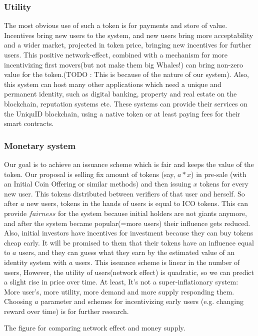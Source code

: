 \documentclass[conference]{IEEEtran}
\begin{document}
\subsubsection{Utility} 
The most obvious use of such a token is for payments and store of value. Incentives bring new users to the system, and new users bring more acceptability and a wider market, projected in token price, bringing new incentives for further users. This positive network-effect, combined with a mechanism for more incentivizing first movers(but not make them big Whales!) can bring non-zero value for the token.(TODO : This is because of the nature of our system). Also, this system can host many other applications which need a unique and permanent identity, such as digital banking, property and real estate on the blockchain, reputation systems etc. These systems can provide their services on the UniquID blockchain, using a native token or at least paying fees for their smart contracts.

\subsubsection{Monetary system}
Our goal is to achieve an issuance scheme which is fair and keeps the value of the token. Our proposal is selling fix amount of tokens (say, $a*x$) in pre-sale (with an Initial Coin Offering or similar methods) and then issuing $x$ tokens for every new user. This tokens distributed between verifiers of that user and herself. So after $a$ new users, tokens in the hands of users is equal to ICO tokens. This can provide $fairness$ for the system because initial holders are not giants anymore, and after the system became popular(=more users) their influence gets reduced. Also, initial investors have incentives for investment because they can buy tokens cheap early. It will be promised to them that their tokens have an influence equal to $a$ users, and they can guess what they earn by the estimated value of an identity system with $a$ users. This issuance scheme is linear in the number of users, However, the utility of users(network effect) is quadratic, so we can predict a slight rise in price over time. At least, It's not a super-inflationary system: More user's, more utility, more demand and more supply responding them. Choosing $a$ parameter and schemes for incentivizing early users (e.g. changing reward over time) is for further research.




The figure for comparing network effect and money supply.
\end{document}
